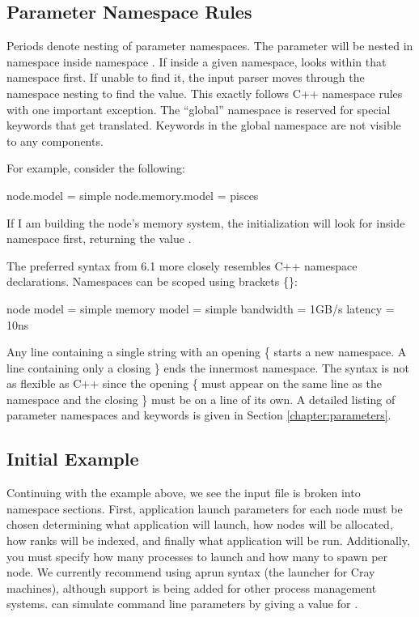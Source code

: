 \subsection{Parameter Namespace Rules}
\label{subsec:parameterNamespace}
Periods denote nesting of parameter namespaces.
The parameter  will be nested in namespace  inside namespace .
If inside a given namespace, \sstmacro looks within that namespace first.
If unable to find it, the input parser moves through the namespace nesting to find the value.
This exactly follows C++ namespace rules with one important exception. 
The ``global'' namespace is reserved for special keywords that get translated.
Keywords in the global namespace are not visible to any components.


For example, consider the following:
\begin{ViFile}
node.model = simple
node.memory.model = pisces
\end{ViFile}
If I am building the node's memory system, the initialization will look for  inside namespace  first, returning the value . 

The preferred syntax from 6.1 more closely resembles C++ namespace declarations. 
Namespaces can be scoped using brackets \{\}:

\begin{ViFile}
node {
 model = simple
 memory {
   model = simple
   bandwidth = 1GB/s
   latency = 10ns
 }
}
\end{ViFile}
Any line containing a single string with an opening \{ starts a new namespace.
A line containing only a closing \} ends the innermost namespace.
The syntax is not as flexible as C++ since the opening \{ must appear on the same line as the namespace and the closing \} must be on a line of its own.
A detailed listing of parameter namespaces and keywords is given in Section \ref{chapter:parameters}.

\subsection{Initial Example}
\label{subsec:initialExample}
Continuing with the example above, we see the input file is broken into namespace sections. 
First, application launch parameters for each node must be chosen determining what application will launch, 
how nodes will be allocated, how ranks will be indexed, and finally what application will be run.  
Additionally, you must specify how many processes to launch and how many to spawn per node.  
We currently recommend using aprun syntax (the launcher for Cray machines), 
although support is being added for other process management systems.
\sstmacro can simulate command line parameters by giving a value for .


